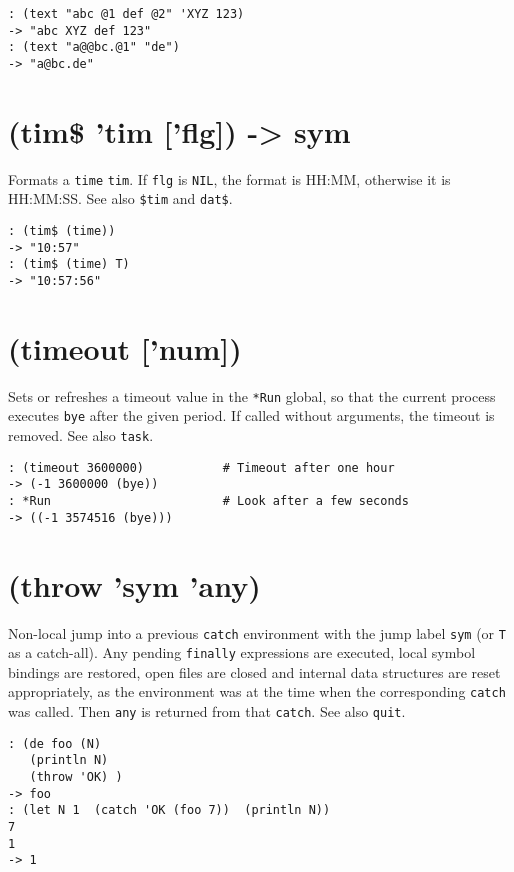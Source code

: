 {{{{{{{{\begin{verbatim}
: (text "abc @1 def @2" 'XYZ 123)
-> "abc XYZ def 123"
: (text "a@@bc.@1" "de")
-> "a@bc.de"
\end{verbatim}

 
\section{(tim\$ 'tim ['flg]) -> sym}
\label{sec-8-1-20-14}


Formats a \texttt{time} \texttt{tim}. If \texttt{flg} is \texttt{NIL}, the format is HH:MM,
otherwise it is HH:MM:SS. See also \texttt{\$tim} and \texttt{dat\$}.


\begin{verbatim}
: (tim$ (time))
-> "10:57"
: (tim$ (time) T)
-> "10:57:56"
\end{verbatim}

 
\section{(timeout ['num])}
\label{sec-8-1-20-15}


Sets or refreshes a timeout value in the \texttt{*Run} global, so that the
current process executes \texttt{bye} after the given period. If called without
arguments, the timeout is removed. See also \texttt{task}.


\begin{verbatim}
: (timeout 3600000)           # Timeout after one hour
-> (-1 3600000 (bye))
: *Run                        # Look after a few seconds
-> ((-1 3574516 (bye)))
\end{verbatim}

 
\section{(throw 'sym 'any)}
\label{sec-8-1-20-16}


Non-local jump into a previous \texttt{catch} environment with the jump label
\texttt{sym} (or \texttt{T} as a catch-all). Any pending \texttt{finally} expressions are
executed, local symbol bindings are restored, open files are closed and
internal data structures are reset appropriately, as the environment was
at the time when the corresponding \texttt{catch} was called. Then \texttt{any} is
returned from that \texttt{catch}. See also \texttt{quit}.


\begin{verbatim}
: (de foo (N)
   (println N)
   (throw 'OK) )
-> foo
: (let N 1  (catch 'OK (foo 7))  (println N))
7
1
-> 1
\end{verbatim}

}}}}}}}}
